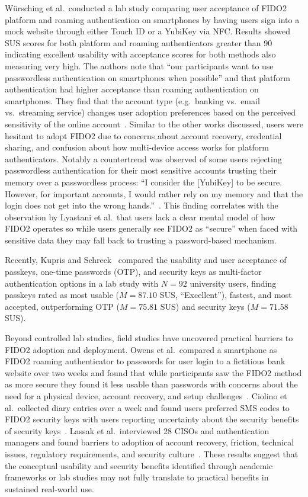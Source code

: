 W\"ursching et al.\ conducted a lab study comparing user acceptance of FIDO2 platform and roaming authentication on smartphones by having users sign into a mock website through either Touch ID\textregistered{} or a YubiKey via NFC. Results showed SUS scores for both platform and roaming authenticators greater than 90 indicating excellent usability with acceptance scores for both methods also measuring very high. The authors note that ``our participants want to use passwordless authentication on smartphones when possible'' and that platform authentication had higher acceptance than roaming authentication on smartphones. They find that the account type (e.g.\ banking vs.\ email vs.\ streaming service) changes user adoption preferences based on the perceived sensitivity of the online account~\cite{wursching_fido2_2023}. Similar to the other works discussed, users were hesitant to adopt FIDO2 due to concerns about account recovery, credential sharing, and confusion about how multi-device access works for platform authenticators. Notably a countertrend was observed of some users rejecting passwordless authentication for their most sensitive accounts trusting their memory over a passwordless process: ``I consider the [YubiKey] to be secure. However, for important accounts, I would rather rely on my memory and that the login does not get into the wrong hands.''~\cite{wursching_fido2_2023}. This finding correlates with the observation by Lyastani et al.\ that users lack a clear mental model of how FIDO2 operates so while users generally see FIDO2 as ``secure'' when faced with sensitive data they may fall back to trusting a password-based mechanism.

Recently, Kupris and Schreck~\cite{kupris_passkey_2026} compared the usability and user acceptance of passkeys, one-time passwords (OTP), and security keys as multi-factor authentication options in a lab study with $N=92$ university users, finding passkeys rated as most usable ($M=87.10$ SUS, ``Excellent''), fastest, and most accepted, outperforming OTP ($M=75.81$ SUS) and security keys ($M=71.58$ SUS).

Beyond controlled lab studies, field studies have uncovered practical barriers to FIDO2 adoption and deployment. Owens et al.\ compared a smartphone as FIDO2 roaming authenticator to passwords for user login to a fictitious bank website over two weeks and found that while participants saw the FIDO2 method as more secure they found it less usable than passwords with concerns about the need for a physical device, account recovery, and setup challenges~\cite{owens_user_2021}. Ciolino et al.\ collected diary entries over a week and found users preferred SMS codes to FIDO2 security keys with users reporting uncertainty about the security benefits of security keys~\cite{ciolino_twominds_2019}. Lassak et al.\ interviewed 28 CISOs and authentication managers and found barriers to adoption of account recovery, friction, technical issues, regulatory requirements, and security culture~\cite{lassak_why_2024}. These results suggest that the conceptual usability and security benefits identified through academic frameworks or lab studies may not fully translate to practical benefits in sustained real-world use.

